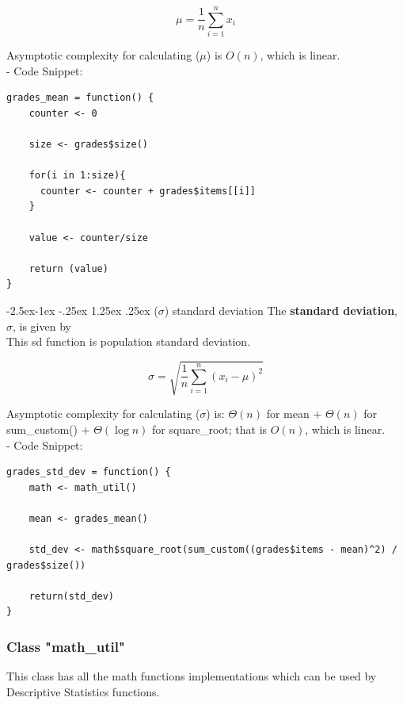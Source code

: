 \documentclass[11pt]{article}
\makeatletter
\renewcommand\paragraph{\@startsection{paragraph}{4}{\z@}%
            {-2.5ex\@plus -1ex \@minus -.25ex}%
            {1.25ex \@plus .25ex}%
            {\normalfont\normalsize\bfseries}}
\makeatother
\begin{document}
$$\mu = \frac{1}{n}\sum_{i=1}^{n} x_i$$

Asymptotic complexity for calculating ($\mu$) is $O(n)$, which is linear.\\

- Code Snippet:\\

\begin{lstlisting}
grades_mean = function() {
    counter <- 0

    size <- grades$size()

    for(i in 1:size){
      counter <- counter + grades$items[[i]]
    }

    value <- counter/size

    return (value)
}
\end{lstlisting}

\paragraph{(\texorpdfstring{$\sigma$}{Sigma}) standard deviation}
The \textbf{standard deviation}, $\sigma$, is given by\\

This \gls{sd} function is population standard deviation.

$$\sigma = \sqrt{\frac{1}{n}\sum_{i=1}^{n} (x_i - \mu)^2}$$

Asymptotic complexity for calculating ($\sigma$) is: $\Theta(n)$ for mean + $\Theta(n)$ for sum\_custom() + $\Theta(\log{n})$ for square\_root; that is $O(n)$, which is linear.\\

- Code Snippet:\\

\begin{lstlisting}
grades_std_dev = function() {
    math <- math_util()

    mean <- grades_mean()

    std_dev <- math$square_root(sum_custom((grades$items - mean)^2) / grades$size())
	  
    return(std_dev)
}
\end{lstlisting}

\subsubsection{Class "math\_util"}

This class has all the math functions implementations which can be used by Descriptive Statistics functions.\\
\end{document}
